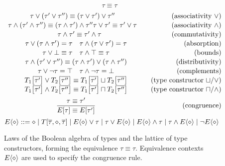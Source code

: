 \begin{figure}
    \centering
    $$ \boxed{\tau \equiv \tau} $$
    $$ \renewcommand\arraystretch{1.1} \begin{array}{cr}
    \tau \join (\tau' \join \tau'') \equiv (\tau \join \tau') \join \tau'' \quad 
    & \text{(associativity \mbox{$\join$})}
    \\
    \tau \meet (\tau' \meet \tau'') \equiv (\tau \meet \tau') \meet \tau''
    \tau \join \tau' \equiv \tau' \join \tau  \quad 
    & \text{(associativity \mbox{$\meet$})} 
    \\
    \quad
    \tau \meet \tau' \equiv \tau' \meet \tau 
    & \text{(commutativity)}
    \\
    \tau \join (\tau \meet \tau') = \tau
    \quad 
    \tau \meet (\tau \join \tau') = \tau
    & \text{(absorption)}
    \\ 
    \tau \join \bot \equiv \tau
    \quad 
    \tau \meet \top \equiv \tau 
    & \text{(bounds)} 
    \\
    \tau \meet (\tau' \join \tau'') \equiv (\tau \meet \tau') \join (\tau \meet \tau'')
    & \text{(distributivity)}
    \\
    \tau \join \comp \tau = \top 
    \quad
    \tau \meet \comp \tau = \bot
    & \text{(complements)} 
    \\ 
    T_1\left[\overline {\tau'}\right] \join T_2\left[\overline {\tau''}\right] \equiv T_1\left[\overline {\tau'}\right] \cjoin T_2\left[\overline {\tau''}\right]
    & \text{(type constructor $\cjoin$/$\join$)}
    \\
    T_1\left[\overline {\tau'}\right] \meet T_2\left[\overline {\tau''}\right] \equiv T_1\left[\overline {\tau'}\right] \cmeet T_2\left[\overline {\tau''}\right]
    & \text{(type constructor $\cmeet$/$\meet$)}
    \\[0.5em] 
    \dfrac{\tau \equiv \tau'}{E[\tau] \equiv E[\tau']} 
    & \text{(congruence)}
    \end{array} $$
    $$ \equivctx ::= \ctxhole \mid T[\overline \tau, \ctxhole, \overline \tau] \mid \equivctx \join \tau \mid \tau \join \equivctx \mid \equivctx \meet \tau \mid \tau \meet \equivctx \mid \comp \equivctx $$
    \caption{Laws of the Boolean algebra of types and the lattice of type constructors, forming the equivalence $\tau \equiv \tau$. Equivalence contexts $\equivctx$ are used to specify the congruence rule.}
    \label{fig:boolean-laws}
\end{figure}

